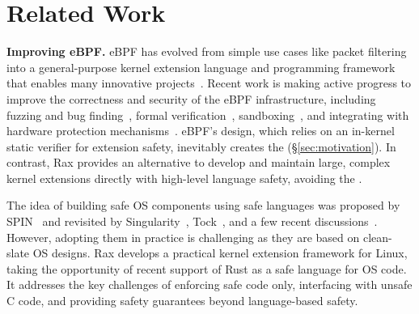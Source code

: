 \section{Related Work}
\label{sec:related}
\vspace{-5pt}

{\bf Improving eBPF.} eBPF has evolved from simple
    use cases like packet filtering~\cite{pf,bsdpf}
    into a general-purpose kernel extension language and programming framework
    that enables many innovative projects~\cite{BMC,Electrode,DINT,Hoiland-Jorgensen:conext:2018,
    Zhong:osdi:2022,ghost-scheduler-lpc,ebpf-mm,
    ghost-scheduler,lpc-24-bpfmm,fetchbpf,sched-ext}.
Recent work is making active progress to improve the correctness and security
    of the eBPF infrastructure, including
    fuzzing and bug finding~\cite{hung2023brf,hao-eurosys,hao-osdi,ebpf-fuzzing},
    formal verification~\cite{ebpf-jit-formal,proof-carrying-verifier,Wang:2014,hari-cav-verification},
    sandboxing~\cite{sandbpf,beebox-security24,safebpf-thomas},
    and integrating with hardware protection mechanisms~\cite{hive-ebpf-sandbox,lu2024moat}.
eBPF's design, which relies on an in-kernel static verifier for extension safety,
    inevitably creates the \gap{} (\S\ref{sec:motivation}).
In contrast, Rax provides an alternative to develop and maintain large, complex kernel extensions directly with
    high-level language safety, avoiding the \gap{}.




 The idea of building safe OS components using
    safe languages was proposed by SPIN~\cite{spin}
    and revisited by Singularity~\cite{singularity}, Tock~\cite{tockos}, and a few recent
    discussions~\cite{Miller-hotos19,untenableVerification,Burtsev-hotos23}.
However, adopting them in practice is challenging as they are based on
    clean-slate OS designs.
Rax develops a practical kernel extension framework for Linux, taking the
    opportunity of recent support of Rust as a safe language for OS code.
It addresses the key challenges of enforcing safe code only, interfacing
    with unsafe C code, and providing safety guarantees beyond language-based safety.

